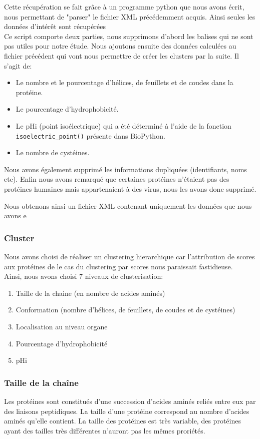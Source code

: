 Cette récupération se fait grâce à un programme python que nous avons écrit, nous permettant de "parser" le fichier XML précédemment acquis. Ainsi seules les données d'intérêt sont récupérées\\

Ce script comporte deux parties, nous supprimons d'abord les balises qui ne sont pas utiles pour notre étude.
Nous ajoutons ensuite des données calculées au fichier précédent qui vont nous permettre de créer les clusters par la suite. Il s'agit de:
\begin{itemize}
\item Le nombre et le pourcentage d'hélices, de feuillets et de coudes dans la protéine.
\item Le pourcentage d'hydrophobicité.
\item Le pHi (point isoélectrique) qui a été déterminé à l'aide de la fonction \texttt{isoelectric\_point()} présente dans BioPython.
\item Le nombre de cystéines.
\end{itemize}

Nous avons également supprimé les informations dupliquées (identifiants, noms etc).
Enfin nous avons remarqué que certaines protéines n'étaient pas des protéines humaines mais appartenaient à des virus, nous les avons donc supprimé.

Nous obtenons ainsi un fichier XML contenant uniquement les données que nous avons e


\subsubsection*{Cluster}
Nous avons choisi de réaliser un clustering hierarchique car l'attribution de scores aux protéines de le cas du clustering par scores nous paraissait fastidieuse.\\
Ainsi, nous avons choisi 7 niveaux de clusterisation:
\begin{enumerate}
\item Taille de la chaine (en nombre de acides aminés)
\item Conformation (nombre d'hélices, de feuillets, de coudes et de cystéines)
\item Localisation au niveau organe
\item Pourcentage d'hydrophobicité
\item pHi
\end{enumerate}


\subsubsection*{Taille de la chaîne}
Les protéines sont constitués d'une succession d'acides aminés reliés entre eux par des liaisons peptidiques. La taille d'une protéine correspond au nombre d'acides aminés qu'elle contient. La taille des protéines est très variable, des protéines ayant des tailles très différentes n'auront pas les m\^emes proriétés.

